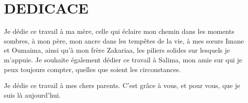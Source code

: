 \newpage

\chapter*{DEDICACE}

Je dédie ce travail à ma mère, celle qui éclaire mon chemin dans les moments sombres, à mon père, mon ancre dans les tempêtes de la vie, à mes sœurs Imane et Oumaima, ainsi qu'à mon frère Zakariaa, les piliers solides sur lesquels je m'appuie. Je souhaite également dédier ce travail à Salima, mon amie sur qui je peux toujours compter, quelles que soient les circonstances.


\vspace{4cm}
Je dédie ce travail à mes chers parents. C'est grâce à vous, et pour vous, que je suis là aujourd'hui. \\




